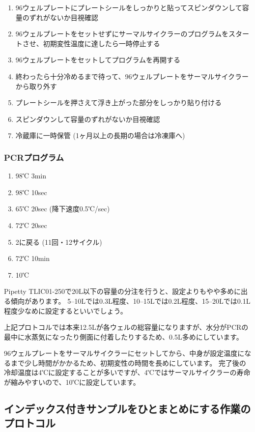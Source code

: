 \documentclass[titlepage,10pt,a4paper]{jsbook}
\begin{document}
\begin{enumerate}
\item 96ウェルプレートにプレートシールをしっかりと貼ってスピンダウンして容量のずれがないか目視確認
\item 96ウェルプレートをセットせずにサーマルサイクラーのプログラムをスタートさせ、初期変性温度に達したら一時停止する
\item 96ウェルプレートをセットしてプログラムを再開する
\item 終わったら十分冷めるまで待って、96ウェルプレートをサーマルサイクラーから取り外す
\item プレートシールを押さえて浮き上がった部分をしっかり貼り付ける
\item スピンダウンして容量のずれがないか目視確認
\item 冷蔵庫に一時保管 (1ヶ月以上の長期の場合は冷凍庫へ)
\end{enumerate}

\subsubsection{PCRプログラム}
\begin{enumerate}
\item 98℃ 3min
\item 98℃ 10sec
\item 65℃ 20sec (降下速度0.5℃/sec)
\item 72℃ 20sec
\item 2に戻る (11回・12サイクル)
\item 72℃ 10min
\item 10℃
\end{enumerate}

Pipetty TLIC01-250で20{\textmu}L以下の容量の分注を行うと、設定よりもやや多めに出る傾向があります。
5--10{\textmu}Lでは0.3{\textmu}L程度、10--15{\textmu}Lでは0.2{\textmu}L程度、15--20{\textmu}Lでは0.1{\textmu}L程度少なめに設定するといいでしょう。

上記プロトコルでは本来12.5{\textmu}Lが各ウェルの総容量になりますが、水分がPCRの最中に水蒸気になったり側面に付着したりするため、0.5{\textmu}L多めにしています。

96ウェルプレートをサーマルサイクラーにセットしてから、中身が設定温度になるまで少し時間がかかるため、初期変性の時間を長めにしています。
完了後の冷却温度は4℃に設定することが多いですが、4℃ではサーマルサイクラーの寿命が縮みやすいので、10℃に設定しています。

\subsection{インデックス付きサンプルをひとまとめにする作業のプロトコル}
\end{document}
